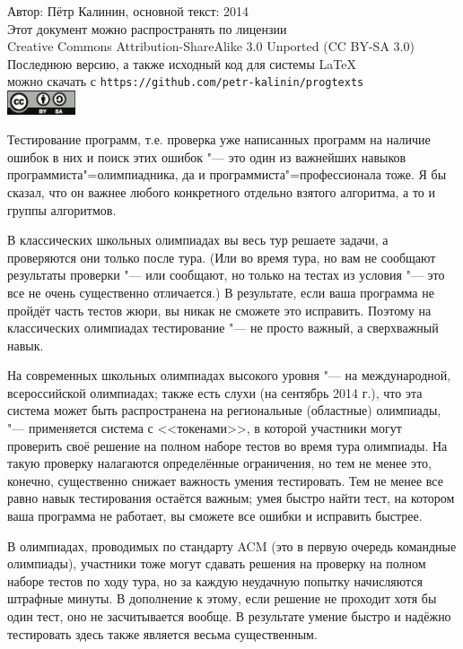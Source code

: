 \documentclass[a4paper,10pt]{problems}
\begin{document}
\begin{flushright}
Автор: Пётр Калинин, основной текст: 2014\\
Этот документ можно распространять по лицензии\\
Creative Commons Attribution-ShareAlike 3.0 Unported (CC BY-SA 3.0)\\
Последнюю версию, а также исходный код для системы \LaTeX\\
можно скачать с \verb`https://github.com/petr-kalinin/progtexts`\\
\includegraphics[width=2cm]{by-sa-corr.eps}
\end{flushright}


Тестирование программ, т.е. проверка уже написанных программ на наличие ошибок в них и поиск этих ошибок "--- 
это один из важнейших навыков программиста"=олимпиадника, да и программиста"=профессионала тоже. 
Я бы сказал, что он важнее любого конкретного отдельно взятого алгоритма, а то и группы алгоритмов.

В классических школьных олимпиадах вы весь тур решаете задачи, а проверяются они только после тура. 
(Или во время тура, но вам не сообщают результаты проверки "--- или сообщают, но только на тестах из условия "--- это все не очень существенно отличается.) 
В результате, если ваша программа не пройдёт часть тестов жюри, вы никак не сможете это исправить. 
Поэтому на классических олимпиадах тестирование "--- не просто важный, а сверхважный навык.

На современных школьных олимпиадах высокого уровня "--- на международной, всероссийской олимпиадах; также есть слухи (на сентябрь 2014 г.), 
что эта система может быть распространена на региональные (областные) олимпиады, "--- применяется система с <<токенами>>, 
в которой участники могут проверить своё решение на полном наборе тестов во время тура олимпиады.
На такую проверку налагаются определённые ограничения, но тем не менее это, конечно, существенно снижает важность умения тестировать.
Тем не менее все равно навык тестирования остаётся важным; умея быстро найти тест, на котором ваша программа не работает, вы сможете все ошибки
и исправить быстрее.

В олимпиадах, проводимых по стандарту ACM (это в первую очередь командные олимпиады), участники тоже могут сдавать решения на проверку на полном наборе тестов по ходу тура, но за каждую неудачную попытку начисляются штрафные минуты. 
В дополнение к этому, если решение не проходит хотя бы один тест, оно не засчитывается вообще. 
В результате умение быстро и надёжно тестировать здесь также является весьма существенным.
\end{document}

